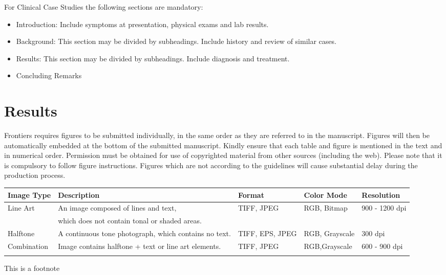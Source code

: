 \documentclass{frontiersMED} %
\begin{document}
For Clinical Case Studies the following sections are mandatory:

\begin{itemize}
\item Introduction: Include symptoms at presentation, physical exams and lab results.
\item Background: This section may be divided by subheadings. Include history and review of similar cases.
\item Results: This section may be divided by subheadings. Include diagnosis and treatment.
\item Concluding Remarks
\end{itemize}




\section{Results}

Frontiers requires figures to be submitted individually, in the same order as they are referred to in the manuscript. Figures will then be automatically embedded at the bottom of the submitted manuscript. Kindly ensure that each table and figure is mentioned in the text and in numerical order. Permission must be obtained for use of copyrighted material from other sources (including the web). Please note that it is compulsory to follow figure instructions. Figures which are not according to the guidelines will cause substantial delay during the production process.

\begin{table}[!t]
{\begin{tabular}{lllll}\toprule
Image Type & Description & Format & Color Mode & Resolution\\\midrule
Line Art & An image composed of lines and text,  & TIFF, JPEG & RGB, Bitmap & 900 - 1200 dpi\\
           & which does not contain tonal or shaded areas.& & &\\
           Halftone & A continuous tone photograph, which contains no text. & TIFF, EPS, JPEG & RGB, Grayscale & 300 dpi\\
Combination & Image contains halftone + text or line art elements. & TIFF, JPEG & RGB,Grayscale & 600 - 900 dpi\\\botrule
\end{tabular}}{This is a footnote}
\end{table}
\end{document}
